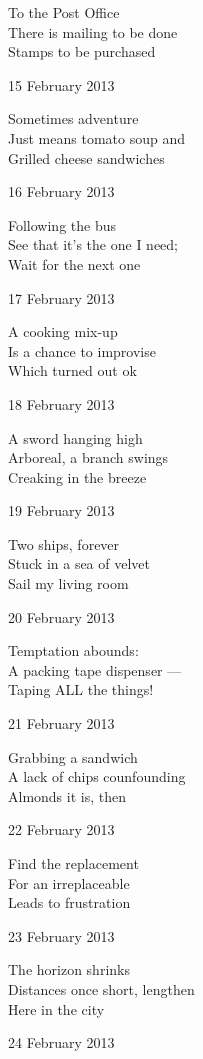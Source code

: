 \documentclass[12pt]{article}
\begin{document}
To the Post Office \\
There is mailing to be done \\
Stamps to be purchased

\newpage

15 February 2013

Sometimes adventure \\
Just means tomato soup and \\
Grilled cheese sandwiches

16 February 2013

Following the bus \\
See that it's the one I need; \\
Wait for the next one

17 February 2013

A cooking mix-up \\
Is a chance to improvise \\
Which turned out ok

18 February 2013

A sword hanging high \\
Arboreal, a branch swings \\
Creaking in the breeze

19 February 2013

Two ships, forever \\
Stuck in a sea of velvet \\
Sail my living room

20 February 2013

Temptation abounds: \\
A packing tape dispenser --- \\
Taping ALL the things!

21 February 2013

Grabbing a sandwich \\
A lack of chips counfounding \\
Almonds it is, then

\newpage

22 February 2013

Find the replacement \\
For an irreplaceable \\
Leads to frustration

23 February 2013

The horizon shrinks \\
Distances once short, lengthen \\
Here in the city

24 February 2013
\end{document}

